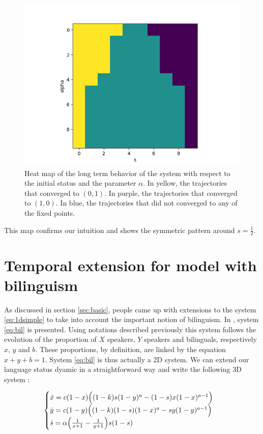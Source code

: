 \documentclass{article}
\begin{document}
\begin{figure}[H]
\centering
\includegraphics[scale=0.5]{convergence_heatmap.png}
\caption{Heat map of the long term behavior of the system with respect to the initial status and the parameter $\alpha$. In yellow, the trajectories that converged to $(0,1)$. In purple, the trajectories that converged to $(1,0)$. In blue, the trajectories that did not converged to any of the fixed points.}
\label{fig:heatmap}
\end{figure}

This map confirms our intuition and shows the symmetric pattern around $s=\frac{1}{2}$.

\section{Temporal extension for model with bilinguism}
\label{sec:2d}
As discussed in section \ref{sec:basic}, people came up with extensions to the system \ref{eq:1dsimple} to take into account the important notion of bilinguism.
In \cite{bilingual}, system \ref{eq:bil} is presented.
Using notations described previously this system follows the evolution of the proportion of $X$ speakers, $Y$ speakers and bilinguals, respectively $x$, $y$ and $b$.
These proportions, by definition, are linked by the equation $x+y+b = 1$.
System \ref{eq:bil} is thus actually a 2D system.
We can extend our language status dyamic in a straightforward way and write the following 3D system :

\begin{equation}
\label{eq:2d}
\begin{cases}
\dot{x} = c(1-x) \Big( (1-k)s(1-y)^a - (1-s)x(1-x)^{a-1} \Big) \\
\dot{y} = c(1-y) \Big( (1-k)(1-s)(1-x)^a - sy(1-y)^{a-1} \Big) \\
\dot{s} = \alpha \Big( \frac{1}{x+1} - \frac{1}{y+1}\Big) s (1-s) \\
\end{cases}
\end{equation}
\end{document}
